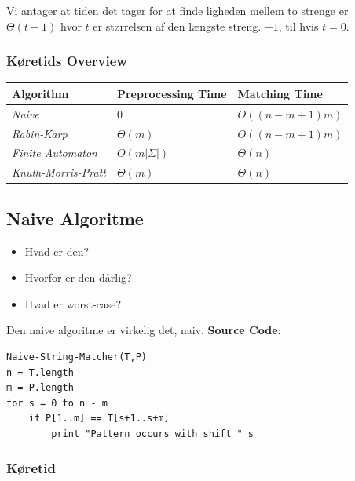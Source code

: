 \documentclass[11pt]{article}
\theoremstyle{definition}
\theoremstyle{remark}
\begin{document}
Vi antager at tiden det tager for at finde ligheden mellem to strenge er $\Theta(t+1)$ hvor $t$ er størrelsen af den længste streng. $+1$, til hvis $t = 0$.



\subsubsection{Køretids Overview}

\begin{table}[h]
\begin{tabular}{|l|l|l|}
\hline
\textbf{Algorithm}          & \textbf{Preprocessing Time} & \textbf{Matching Time} \\ \hline
\textit{Naive}              & $0$                         & $O((n-m+1)m)$          \\ \hline
\textit{Rabin-Karp}         & $\Theta (m)$                & $O((n-m+1)m)$          \\ \hline
\textit{Finite Automaton}   & $O(m |\Sigma |)$            & $\Theta (n) $          \\ \hline
\textit{Knuth-Morris-Pratt} & $\Theta (m)$                & $\Theta (n)$           \\ \hline
\end{tabular}
\end{table}


\subsection{Naive Algoritme}
\label{subsec:naive}

\begin{itemize}
\item Hvad er den? 
\item Hvorfor er den dårlig? 
\item Hvad er worst-case? 
\end{itemize}


Den naive algoritme er virkelig det, naiv.
\textbf{Source Code}:

\begin{verbatim}
Naive-String-Matcher(T,P)
n = T.length
m = P.length
for s = 0 to n - m
    if P[1..m] == T[s+1..s+m]
        print "Pattern occurs with shift " s
\end{verbatim}

\subsubsection{Køretid}
\end{document}

